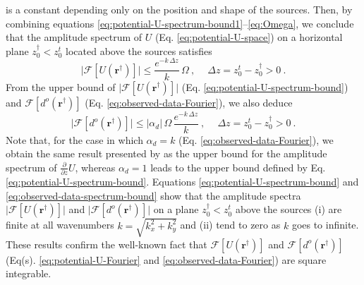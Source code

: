 is a constant depending only on the position and shape of the sources. 
Then, by combining equations 
\ref{eq:potential-U-spectrum-bound1}--\ref{eq:Omega},
we conclude that the amplitude spectrum of 
$U$ (Eq. \ref{eq:potential-U-space}) on a horizontal plane 
$z^{\dagger}_{0} < z^{t}_{0}$ located above the sources satisfies 
\begin{equation}
	\vert \mathcal{F} [ U(\mathbf{r}^{\dagger}) ] \vert \le
	\frac{e^{- k \, \Delta z}}{k} \, \Omega \: ,
	\: \quad \Delta z = z^{t}_{0} - z^{\dagger}_{0} > 0 \: .
	\label{eq:potential-U-spectrum-bound}
\end{equation}
From the upper bound of $\vert \mathcal{F} [ U(\mathbf{r}^{\dagger}) ] \vert$
(Eq. \ref{eq:potential-U-spectrum-bound}) and $\mathcal{F} [ d^{o}(\mathbf{r}^{\dagger}) ]$
(Eq. \ref{eq:observed-data-Fourier}), we also deduce
\begin{equation}
	\vert \mathcal{F} [ d^{o}(\mathbf{r}^{\dagger}) ] \vert \le
	\vert \alpha_{d} \vert \, \Omega \, 
	\frac{e^{- k \, \Delta z}}{k} \: ,
	\: \quad \Delta z = z^{t}_{0} - z^{\dagger}_{0} > 0 \: .
	\label{eq:observed-data-spectrum-bound}
\end{equation}
Note that, for the case in which $\alpha_{d} = k$ (Eq. \ref{eq:observed-data-Fourier}), 
we obtain the same result presented by \cite{bhattacharyya1967} as the upper bound for the 
amplitude spectrum of $\tfrac{\partial}{\partial z} U$, whereas
$\alpha_{d} = 1$ leads to the upper bound defined by Eq. \ref{eq:potential-U-spectrum-bound}.
Equations \ref{eq:potential-U-spectrum-bound} and \ref{eq:observed-data-spectrum-bound} 
show that the amplitude spectra 
$\vert \mathcal{F} [ U(\mathbf{r}^{\dagger}) ] \vert$ and 
$\vert \mathcal{F} [ d^{o}(\mathbf{r}^{\dagger}) ] \vert$ on a plane $z^{\dagger}_{0} < z^{t}_{0}$ 
above the sources 
(i) are finite at all wavenumbers $k = \sqrt{k_{x}^{2} + k_{y}^{2}}$ and (ii) tend
to zero as $k$ goes to infinite.
These results confirm the well-known fact that 
$\mathcal{F} [ U(\mathbf{r}^{\dagger}) ]$ and $\mathcal{F} [ d^{o}(\mathbf{r}^{\dagger}) ]$ 
(Eq(s). \ref{eq:potential-U-Fourier} and \ref{eq:observed-data-Fourier}) are square integrable.